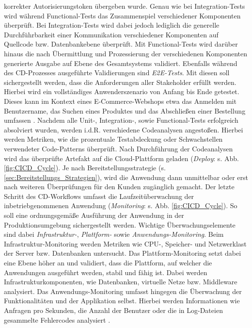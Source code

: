 korrekter Autorisierungstoken übergeben wurde. Genau wie bei Integration-Tests wird während Functional-Tests das Zusammenspiel verschiedener Komponenten überprüft. Bei Integration-Tests wird dabei jedoch lediglich die generelle Durchführbarkeit einer Kommunikation verschiedener Komponenten auf Quellcode bzw. Datenbankebene überprüft. Mit Functional-Tests wird darüber hinaus die nach Übermittlung und Prozessierung der verschiedenen Komponenten generierte Ausgabe auf Ebene des Gesamtsystems validiert. Ebenfalls während des CD-Prozesses ausgeführte Validierungen sind \textit{\ac{E2E-Tests}}. Mit diesen soll sichergestellt werden, dass die Anforderungen aller Stakeholder erfüllt werden. Hierbei wird ein vollständiges Anwenderszenario von Anfang bis Ende getestet. Dieses kann im Kontext eines E-Commerce-Webshops etwa das Anmelden mit Benutzername, das Suchen eines Produktes und das Abschließen einer Bestellung umfassen \cite{Bose.20230220}. Nachdem alle Unit-, Integration-, sowie Functional-Tests erfolgreich absolviert wurden, werden i.d.R. verschiedene Codeanalysen angestoßen. Hierbei werden Metriken, wie die prozentuale Testabdeckung oder Schwachstellen verwendeter Code-Patterns überprüft. Nach Durchführung der Codeanalysen wird das überprüfte Artefakt auf die Cloud-Plattform geladen (\textit{Deploy}: s. Abb. \ref*{fig:CICD_Cycle}). Je nach Bereitstellungsstrategie (s. \ref*{sec:Bereitstellungs_Strategien}), wird die Anwendung dann unmittelbar oder erst nach weiteren Überprüfungen für den Kunden zugänglich gemacht. Der letzte Schritt des CD-Workflows umfasst die Laufzeitüberwachung der inbetriebgenommenen Anwendung (\textit{Monitoring}: s. Abb. \ref*{fig:CICD_Cycle}). So soll eine ordnungsgemäße Ausführung der Anwendung in der Produktionsumgebung sichergestellt werden. Wichtige Überwachungselemente sind dabei \textit{Infrastruktur-}, \textit{Plattform-} sowie \textit{Anwendungs-Monitoring}. Beim Infrastruktur-Monitoring werden Metriken wie CPU-, Speicher- und Netzwerklast der Server bzw. Datenbanken untersucht. Das Plattform-Monitoring setzt dabei eine Ebene höher an und validiert, dass die Plattform, auf welcher die Anwendungen ausgeführt werden, stabil und fähig ist. Dabei werden Infrastrukturkomponenten, wie Datenbanken, virtuelle Netze bzw. Middleware analysiert. Das Anwendungs-Moni\-toring umfasst hingegen die Überwachung der Funktionalitäten und der Applikation selbst. Hierbei werden Informationen wie Anfragen pro Sekunden, die Anzahl der Benutzer oder die in Log-Dateien gesammelte Fehlercodes analysiert \cite[21]{Halstenberg.2020}. 

